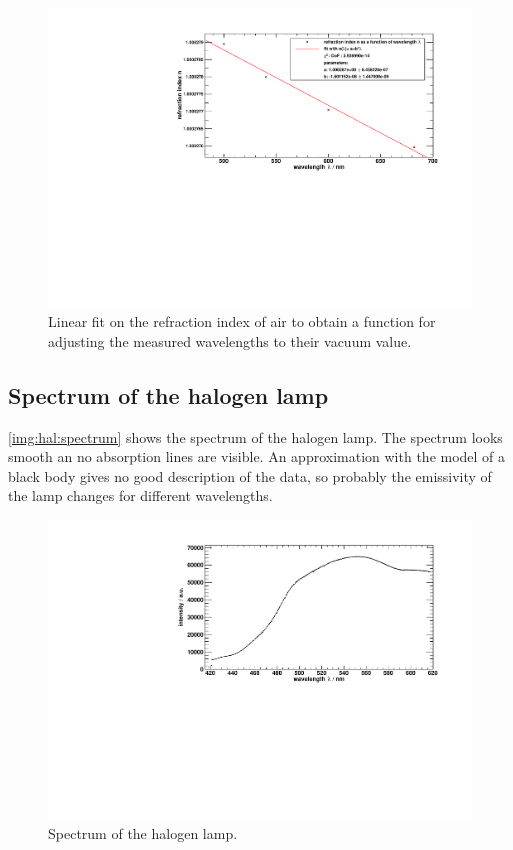 \begin{figure}[H]
\begin{center}
  \includegraphics[width=\textwidth]{../img/fit_lambda.pdf}
  \caption[---]{Linear fit on the refraction index of air to obtain a function for adjusting
  the measured wavelengths to their vacuum value.}
  \label{img:refindex}
\end{center}
\end{figure}




\subsection{Spectrum of the halogen lamp}

\autoref{img:hal:spectrum} shows the spectrum of the halogen lamp.
The spectrum looks smooth an no absorption lines are visible.
An approximation with the model of a black body gives no good description of the data,
so probably the emissivity of the lamp changes for different wavelengths. 



\begin{figure}[H]
\begin{center}
  \includegraphics[width=\textwidth]{../img/halogen_lamp.pdf}
  \caption[---]{Spectrum of the halogen lamp.}
  \label{img:hal:spectrum}
\end{center}
\end{figure}




